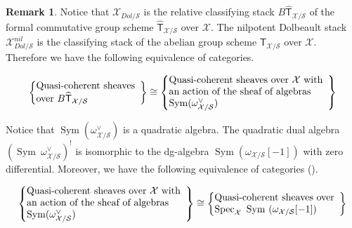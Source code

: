 \documentclass[11pt]{amsart}
\DeclareMathOperator{\Sym}{Sym}
\DeclareMathOperator{\Spec}{Spec}
\theoremstyle{plain}
\numberwithin{equation}{section}
\theoremstyle{definition}
\newtheorem{Rem}[Def]{Remark}
\theoremstyle{plain}
\begin{document}
\begin{Rem}\label{OCOR}
    Notice that $\mathcal X_{Dol/\mathcal S}$ is the relative classifying stack $B\widehat{\mathsf{T}}_{\mathcal X/\mathcal S}$ of the formal  commutative group scheme $\widehat{\mathsf{T}}_{\mathcal X/\mathcal S}$ over $\mathcal X$. The nilpotent Dolbeault stack $\mathcal X^{nil}_{Dol/\mathcal S}$ is the classifying stack of the abelian group scheme $\mathsf{T}_{\mathcal X/\mathcal S}$ over $\mathcal X$. Therefore we have the following equivalence of categories. 

    
    \begin{equation}\label{equi1112}
\left\{
\begin{array}{@{}ll@{}} 
\text{Quasi-coherent sheaves}\\
\text{over}~ B\widehat{\mathsf{T}}_{\mathcal X/\mathcal S}
\end{array}\right\}
\cong \left\{
\begin{array}{@{}ll@{}} 
\text{Quasi-coherent sheaves over}~\mathcal X~\text{with}\\
\text{an action of the sheaf of algebras} \\
\Sym (\omega^{\vee}_{\mathcal X/\mathcal S})
\end{array}\right\}
\end{equation}

\smallskip

Notice that $\Sym (\omega^{\vee}_{\mathcal X/\mathcal S})$ is a quadratic algebra. The quadratic dual algebra $(\Sym ~\omega^{\vee}_{\mathcal X/\mathcal S})^!$ is isomorphic to the dg-algebra $\Sym(\omega_{\mathcal X/\mathcal S}[-1])$ with zero differential. Moreover, we have the following equivalence of categories (\cite{PP}). 


  \begin{equation}\label{equi1111}
\left\{
\begin{array}{@{}ll@{}} 
\text{Quasi-coherent sheaves over}~\mathcal X~\text{with}\\
\text{an action of the sheaf of algebras} \\
\Sym (\omega^{\vee}_{\mathcal X/\mathcal S})
\end{array}\right\}
\cong
\left\{
\begin{array}{@{}ll@{}} 
\text{Quasi-coherent sheaves over}\\
\Spec_{\mathcal{X}} ~ \Sym~(\omega_{\mathcal X/\mathcal S}[-1])
\end{array}\right\}
\end{equation}



\end{Rem}
\end{document}
